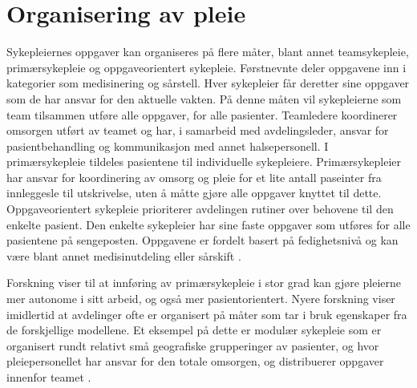 \section{Organisering av pleie}
\label{sec:pleie}

Sykepleiernes oppgaver kan organiseres på flere måter, blant annet teamsykepleie, primærsykepleie og oppgaveorientert sykepleie. Førstnevnte deler oppgavene inn i kategorier som medisinering og sårstell. Hver sykepleier får deretter sine oppgaver som de har ansvar for den aktuelle vakten. På denne måten vil sykepleierne som team tilsammen utføre alle oppgaver, for alle pasienter. Teamledere koordinerer omsorgen utført av teamet og har, i samarbeid med avdelingsleder, ansvar for pasientbehandling og kommunikasjon med annet halsepersonell. I primærsykepleie tildeles pasientene til individuelle sykepleiere. Primærsykepleier har ansvar for koordinering av omsorg og pleie for et lite antall paseinter fra innleggesle til utskrivelse, uten å måtte gjøre alle oppgaver knyttet til dette. Oppgaveorientert sykepleie prioriterer avdelingen rutiner over behovene til den enkelte pasient. Den enkelte sykepleier har sine faste oppgaver som utføres for alle pasientene på sengeposten. Oppgavene er fordelt basert på fedighetsnivå og kan være blant annet medisinutdeling eller sårskift \citep{Rygh13}.

\noindent
Forskning viser til at innføring av primærsykepleie i stor grad kan gjøre pleierne mer autonome i sitt arbeid, og også mer pasientorientert. Nyere forskning viser imidlertid at avdelinger ofte er organisert på måter som tar i bruk egenskaper fra de forskjellige modellene. Et eksempel på dette er modulær sykepleie som er organisert rundt relativt små geografiske grupperinger av pasienter, og hvor pleiepersonellet har ansvar for den totale omsorgen, og distribuerer oppgaver innenfor teamet \citep{Rygh13}.
